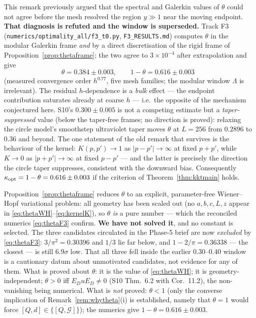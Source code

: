 \documentclass[11pt]{article}
\begin{document}
\begin{remark}\label{rem:twonum}
This remark previously argued that the spectral and Galerkin values of $\theta$ could not
agree before the mesh resolved the region $y\gg1$ near the moving endpoint.  \textbf{That
diagnosis is refuted and the window is superseded.}  Track F3
(\texttt{numerics/optimality\_all/f3\_t0.py}, \texttt{F3\_RESULTS.md}) computes $\theta$ in
the modular Galerkin frame \emph{and} by a direct discretisation of the rigid frame of
Proposition~\ref{prop:thetaframe}; the two agree to $3\times10^{-4}$ after extrapolation
and give
\begin{equation}\label{eq:thetaF3}
 \theta=0.384\pm0.003,\qquad 1-\theta=0.616\pm0.003
\end{equation}
(measured convergence order $h^{0.77}$, five mesh families; the modular window $\Lambda$ is
irrelevant).  The residual $h$-dependence is a \emph{bulk} effect --- the endpoint
contribution saturates already at coarse $h$ --- i.e.\ the opposite of the mechanism
conjectured here.  S10's $0.300\pm0.005$ is not a competing estimate but a
\emph{taper-suppressed} value (below the taper-free frames; no direction is proved): relaxing the circle model's smoothstep ultraviolet
taper moves $\theta$ at $L=256$ from $0.2896$ to $0.36$ and beyond.  The one statement of
the old remark that survives is the behaviour of the kernel: $K(p,p')\to1$ as
$|p-p'|\to\infty$ at fixed $p+p'$, while $K\to0$ as $|p+p'|\to\infty$ at fixed $p-p'$ ---
and the latter is precisely the direction the circle taper suppresses, consistent with the
downward bias.  Consequently $\kappa_{\rm opt}=1-\theta=0.616\pm0.003$ if the criterion of
Theorem~\ref{thm:kktmain} holds.
\end{remark}

\begin{verdictgap}
Proposition~\ref{prop:thetaframe} reduces $\theta$ to an explicit, parameter-free
Wiener--Hopf variational problem: all geometry has been scaled out (no $a,b,c,L,z$ appear
in \eqref{eq:thetaWH}--\eqref{eq:kernelK}), so $\theta$ \emph{is} a pure number --- which
the reconciled numerics \eqref{eq:thetaF3} confirm.  \textbf{We have not solved it}, and no
constant is selected.  The three candidates circulated in the Phase-5 brief are now
\emph{excluded} by \eqref{eq:thetaF3}: $3/\pi^2=0.30396$ and $1/3$ lie far below, and
$1-2/\pi=0.36338$ --- the closest --- is still $6.9\sigma$ low.  That all three fell inside
the earlier $0.30$--$0.40$ window is a cautionary datum about unmotivated candidates, not
evidence for any of them.  What is proved about $\theta$: it is the value of
\eqref{eq:thetaWH}; it is geometry-independent; $\theta>0$ iff $E_DuE_D\ne0$ (S10 Thm.~6.2
with Cor.~11.2), the non-vanishing being numerical.  What is \emph{not} proved: $\theta<1$
(only the converse implication of Remark~\ref{rem:whytheta}(i) is established, namely that
$\theta=1$ would force $[Q,d]\in\overline{\{[Q,\mathcal G]\}}$); the numerics give
$1-\theta=0.616\pm0.003$.
\end{verdictgap}
\end{document}
